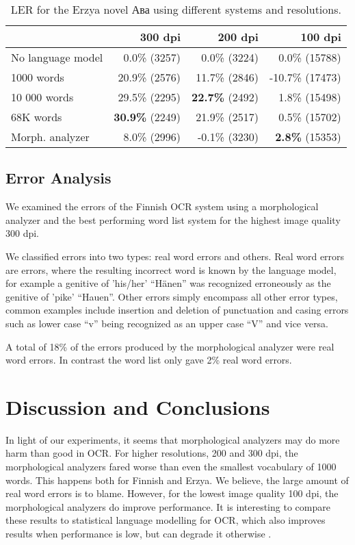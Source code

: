 \documentclass[b5paper]{article}
\begin{document}
\begin{table}[!htb]
\begin{center}
\begin{tabular}{lrrr}
\hline 
                  & 300 dpi & 200 dpi & 100 dpi \\
\hline 
No language model &  0.0\% (3257)  &  0.0\% (3224)  &  0.0\% (15788)  \\
1000 words        &  20.9\% (2576)  &  11.7\% (2846)  & -10.7\%  (17473) \\
10 000 words      &  29.5\% (2295)  &   {\bf 22.7\%} (2492)  & 1.8\% (15498)  \\
68K words         &  {\bf 30.9\%} (2249)  &  21.9\% (2517)  & 0.5\% (15702)\\
Morph. analyzer   &  8.0\% (2996)  &  -0.1\% (3230)  & {\bf 2.8\%} (15353)  \\
\hline 
\end{tabular}
\caption{LER for the Erzya novel Ава using different systems and resolutions.}\label{myv-novel-res}
\end{center}
\end{table}

\subsection{Error Analysis}

We examined the errors of the Finnish OCR system using a morphological
analyzer and the best performing word list system for the highest
image quality 300 dpi.

We classified errors into two types: real word errors and others. Real
word errors are errors, where the resulting incorrect word is known by
the language model, for example a genitive of
'his/her' ``Hänen'' was recognized erroneously as the genitive
of 'pike' ``Hauen''. Other errors simply encompass all other error
types, common examples include insertion and deletion of punctuation
and casing errors such as lower case ``v'' being recognized as an
upper case ``V'' and vice versa.

A total of 18\% of the errors produced by the morphological analyzer
were real word errors. In contrast the word list only gave 2\% real
word errors.

\section{Discussion and Conclusions}
\label{disc}

In light of our experiments, it seems that morphological analyzers may
do more harm than good in OCR. For higher resolutions, 200 and 300 dpi,
the morphological analyzers fared worse than even the smallest
vocabulary of 1000 words. This happens both for Finnish and Erzya. We
believe, the large amount of real word errors is to blame. However,
for the lowest image quality 100 dpi, the morphological analyzers do
improve performance. It is interesting to compare these results to
statistical language modelling for OCR, which also improves results
when performance is low, but can degrade it otherwise \cite{smith11}.
\end{document}
